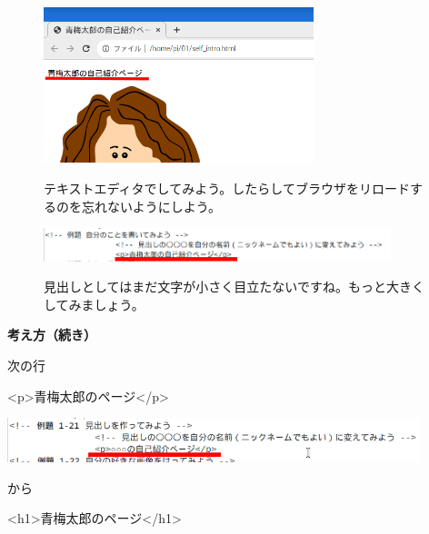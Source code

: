 \begin{figure}[ht]
\begin{minipage}{\textwidth}
    \includegraphics[width=0.7\textwidth]{text01-img/textbook-img154.png}


    \bigskip

    テキストエディタでしてみよう。したらしてブラウザをリロードするのを忘れないようにしよう。


    \bigskip

    \includegraphics[width=0.9\textwidth]{text01-img/textbook-img155.png}


    \bigskip


    見出しとしてはまだ文字が小さく目立たないですね。もっと大きくしてみましょう。




    \bigskip
  \end{minipage}

\end{figure}

\clearpage


\flushleft
\textbf{考え方（続き）}




次の行

{\textless}p{\textgreater}青梅太郎のページ{\textless}/p{\textgreater}

\bigskip

\includegraphics[width=0.9\textwidth]{text01-img/textbook-img158.png}

から

{\textless}h1{\textgreater}青梅太郎のページ{\textless}/h1{\textgreater}

